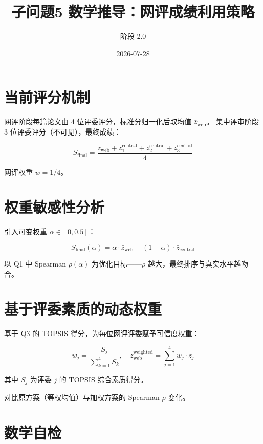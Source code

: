 \documentclass[UTF8]{ctexart}
\title{子问题5 数学推导：网评成绩利用策略}
\author{阶段 2.0}
\date{2026-07-28}
\begin{document}
\maketitle

\section{当前评分机制}

网评阶段每篇论文由 4 位评委评分，标准分归一化后取均值 $\bar{z}_{\text{web}}$。
集中评审阶段 3 位评委评分（不可见），最终成绩：

\begin{equation}
S_{\text{final}} = \frac{\bar{z}_{\text{web}} + z_1^{\text{central}} + z_2^{\text{central}} + z_3^{\text{central}}}{4}
\end{equation}

网评权重 $w = 1/4$。

\section{权重敏感性分析}

引入可变权重 $\alpha \in [0, 0.5]$：

\begin{equation}
S_{\text{final}}(\alpha) = \alpha \cdot \bar{z}_{\text{web}} + (1-\alpha) \cdot \bar{z}_{\text{central}}
\end{equation}

以 Q1 中 Spearman $\rho(\alpha)$ 为优化目标——$\rho$ 越大，最终排序与真实水平越吻合。

\section{基于评委素质的动态权重}

基于 Q3 的 TOPSIS 得分，为每位网评评委赋予可信度权重：

\begin{equation}
w_j = \frac{S_j}{\sum_{k=1}^{4} S_k}, \quad \bar{z}_{\text{web}}^{\text{weighted}} = \sum_{j=1}^{4} w_j \cdot z_j
\end{equation}

其中 $S_j$ 为评委 $j$ 的 TOPSIS 综合素质得分。

对比原方案（等权均值）与加权方案的 Spearman $\rho$ 变化。

\section{数学自检}
\end{document}
